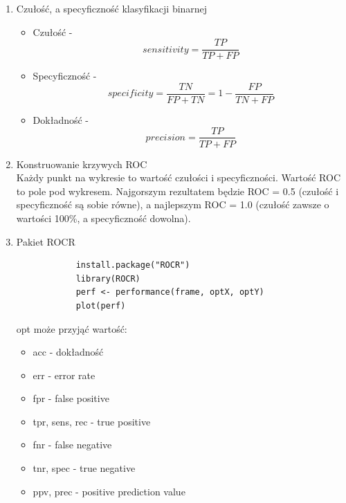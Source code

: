 \documentclass[11pt]{article}
\begin{document}
\begin{enumerate}
        \item Czułość, a specyficzność klasyfikacji binarnej
        \begin{itemize}
        	\item Czułość - $$sensitivity = \frac{TP}{TP+FP}$$
        	\item Specyficzność - $$specificity = \frac{TN}{FP+TN} = 1 - \frac{FP}{TN+FP}$$
        	\item Dokładność - $$precision = \frac{TP}{TP+FP}$$
        \end{itemize}
        
        \item Konstruowanie krzywych ROC \\
        Każdy punkt na wykresie to wartość czułości i specyficzności. Wartość ROC to
        pole pod wykresem. Najgorszym rezultatem będzie ROC = 0.5 (czułość i specyficzność są sobie równe), a najlepszym ROC = 1.0 (czułość zawsze o wartości 100\%, a specyficzność dowolna).
        
        \item Pakiet ROCR
        \begin{verbatim}
        	install.package("ROCR")
        	library(ROCR)
        	perf <- performance(frame, optX, optY)
        	plot(perf)
        \end{verbatim}
        opt może przyjąć wartość:
        \begin{itemize}
        	\item acc - dokładność
        	\item err - error rate
        	\item fpr - false positive
        	\item tpr, sens, rec - true positive
        	\item fnr - false negative
        	\item tnr, spec - true negative
        	\item ppv, prec - positive prediction value
        \end{itemize}
    \end{enumerate}
    
\end{document}
